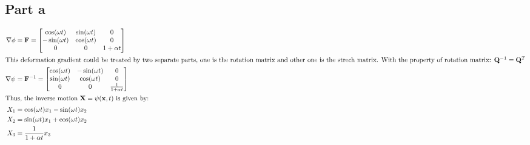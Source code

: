\documentclass[a4paper,12pt]{article} %
\begin{document}
\subsection{Part a}
\begin{align*}
\nabla\phi & =\mathbf{F} = 
\begin{bmatrix} \cos(\omega t) & \sin(\omega t) & 0 \\
               -\sin(\omega t) & \cos(\omega t) & 0 \\
                0            & 0            & 1+\alpha t \end{bmatrix}\\
\intertext{This deformation gradient could be treated by two separate parts, one is the rotation matrix and other one is the strech matrix. With the property of rotation matrix: ${\mathbf{Q}}^{-1} ={\mathbf{Q}}^{T}$}
\nabla \psi &= {\mathbf{F}}^{-1} = \begin{bmatrix} \cos(\omega t) & -\sin(\omega t) & 0 \\
    \sin(\omega t) & \cos(\omega t) & 0 \\
     0            & 0            & \frac{1}{1+\alpha t} \end{bmatrix}\\
\intertext{Thus, the inverse motion $\mathbf{X}=\psi(\mathbf{x},t)$ is given by:}
 X_1 &= \cos(\omega t)x_1 - \sin(\omega t)x_2\\
 X_2 &= \sin(\omega t)x_1 + \cos(\omega t)x_2\\
 X_3 &= \frac{1}{1+\alpha t} x_3
\end{align*}
\end{document}
